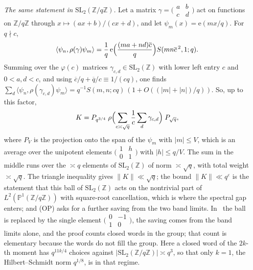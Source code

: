 \documentclass[11pt]{amsart}
\theoremstyle{definition}
\theoremstyle{remark}
\numberwithin{equation}{section}
\newcommand{\Z}{\mathbb Z}
\newcommand{\e}{\mathrm e}
\newcommand{\eps}{\varepsilon}
\newcommand{\inv}[1]{\overline{#1}}
\begin{document}
\emph{The same statement in $\mathrm{SL}_2(\Z/q\Z)$.}  Let a matrix
$\gamma=\bigl(\begin{smallmatrix}a&b\\c&d\end{smallmatrix}\bigr)$ act on
functions on $\Z/q\Z$ through $x\mapsto(ax+b)/(cx+d)$, and let
$\psi_m(x)=\e(mx/q)$.  For $q\nmid c$,
\[
 \langle\psi_n,\rho(\gamma)\psi_m\rangle
 =\frac1q\,\e\Bigl(\frac{(ma+nd)\inv c}{q}\Bigr)S(mn\inv c^{\,2},1;q).
\]
Summing over the $\varphi(c)$ matrices $\gamma_{c,d}\in\mathrm{SL}_2(\Z)$
with lower left entry $c$ and $0<a,d<c$, and using
$\inv c/q+\inv q/c\equiv1/(cq)$, one finds
$\sum_d\langle\psi_n,\rho(\gamma_{c,d})\psi_m\rangle
=q^{-1}S(m,n;cq)\,(1+O((|m|+|n|)/q))$.  So, up to this factor,
\[
 K=P_{q^{3/4}}\;\rho\Bigl(\sum_{c\asymp\sqrt q}\frac1c\sum_d\gamma_{c,d}\Bigr)
 \;P_{\sqrt q},
\]
where $P_V$ is the projection onto the span of the $\psi_m$ with
$|m|\le V$, which is an average over the unipotent elements
$\bigl(\begin{smallmatrix}1&h\\0&1\end{smallmatrix}\bigr)$ with
$|h|\le q/V$.  The sum in the middle runs over the $\asymp q$ elements of
$\mathrm{SL}_2(\Z)$ of norm $\asymp\sqrt q$, with total weight
$\asymp\sqrt q$.  The triangle inequality gives $\|K\|\ll\sqrt q$; the
bound $\|K\|\ll q^{\eps}$ is the statement that this ball of
$\mathrm{SL}_2(\Z)$ acts on the nontrivial part of $L^2(\mathbb
P^1(\Z/q\Z))$ with square-root cancellation, which is where the spectral
gap enters; and (OP) asks for a further saving from the two band limits.
In~\cite{Pas25b} the ball is replaced by the single element
$\bigl(\begin{smallmatrix}0&-1\\1&0\end{smallmatrix}\bigr)$, the saving
comes from the band limits alone, and the proof counts closed words in the
group; that count is elementary because the words do not fill the group.
Here a closed word of the $2k$-th moment has $q^{11k/4}$ choices against
$|\mathrm{SL}_2(\Z/q\Z)|\asymp q^3$, so that only $k=1$, the
Hilbert--Schmidt norm $q^{1/8}$, is in that regime.
\end{document}
